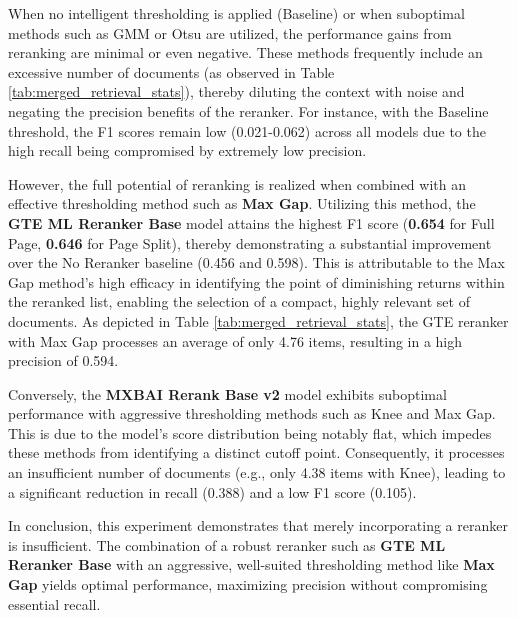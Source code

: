 When no intelligent thresholding is applied (Baseline) or when suboptimal methods such as GMM or Otsu are utilized, the performance gains from reranking are minimal or even negative. These methods frequently include an excessive number of documents (as observed in Table \ref{tab:merged_retrieval_stats}), thereby diluting the context with noise and negating the precision benefits of the reranker. For instance, with the Baseline threshold, the F1 scores remain low (0.021-0.062) across all models due to the high recall being compromised by extremely low precision.

However, the full potential of reranking is realized when combined with an effective thresholding method such as \textbf{Max Gap}. Utilizing this method, the \textbf{GTE ML Reranker Base} model attains the highest F1 score (\textbf{0.654} for Full Page, \textbf{0.646} for Page Split), thereby demonstrating a substantial improvement over the No Reranker baseline (0.456 and 0.598). This is attributable to the Max Gap method's high efficacy in identifying the point of diminishing returns within the reranked list, enabling the selection of a compact, highly relevant set of documents. As depicted in Table \ref{tab:merged_retrieval_stats}, the GTE reranker with Max Gap processes an average of only 4.76 items, resulting in a high precision of 0.594.

Conversely, the \textbf{MXBAI Rerank Base v2} model exhibits suboptimal performance with aggressive thresholding methods such as Knee and Max Gap. This is due to the model's score distribution being notably flat, which impedes these methods from identifying a distinct cutoff point. Consequently, it processes an insufficient number of documents (e.g., only 4.38 items with Knee), leading to a significant reduction in recall (0.388) and a low F1 score (0.105).

In conclusion, this experiment demonstrates that merely incorporating a reranker is insufficient. The combination of a robust reranker such as \textbf{GTE ML Reranker Base} with an aggressive, well-suited thresholding method like \textbf{Max Gap} yields optimal performance, maximizing precision without compromising essential recall.



